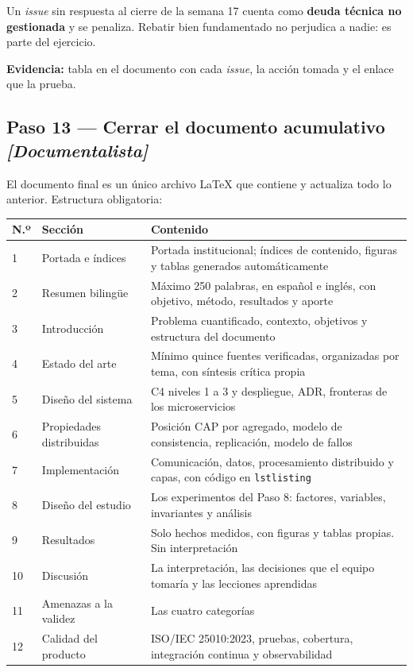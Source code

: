 \documentclass[11pt,a4paper]{article}
\newcommand{\paso}[1]{\subsection{#1}}
\begin{document}
	Un \emph{issue} sin respuesta al cierre de la semana 17 cuenta como \textbf{deuda técnica no gestionada} y se penaliza. Rebatir bien fundamentado no perjudica a nadie: es parte del ejercicio.
	
	\textbf{Evidencia:} tabla en el documento con cada \emph{issue}, la acción tomada y el enlace que la prueba.
	
	\paso{Paso 13 --- Cerrar el documento acumulativo \emph{[Documentalista]}}
	
	El documento final es un único archivo LaTeX que contiene y actualiza todo lo anterior. Estructura obligatoria:
	
	\begin{center}
		\footnotesize
		\begin{longtable}{@{}p{0.7cm}p{4.4cm}p{10.1cm}@{}}
			\toprule
			\textbf{N.º} & \textbf{Sección} & \textbf{Contenido} \\
			\midrule
			\endhead
			1 & Portada e índices & Portada institucional; índices de contenido, figuras y tablas generados automáticamente \\
			2 & Resumen bilingüe & Máximo 250 palabras, en español e inglés, con objetivo, método, resultados y aporte \\
			3 & Introducción & Problema cuantificado, contexto, objetivos y estructura del documento \\
			4 & Estado del arte & Mínimo quince fuentes verificadas, organizadas por tema, con síntesis crítica propia \\
			5 & Diseño del sistema & C4 niveles 1 a 3 y despliegue, ADR, fronteras de los microservicios \\
			6 & Propiedades distribuidas & Posición CAP por agregado, modelo de consistencia, replicación, modelo de fallos \\
			7 & Implementación & Comunicación, datos, procesamiento distribuido y capas, con código en \texttt{lstlisting} \\
			8 & Diseño del estudio & Los experimentos del Paso 8: factores, variables, invariantes y análisis \\
			9 & Resultados & Solo hechos medidos, con figuras y tablas propias. Sin interpretación \\
			10 & Discusión & La interpretación, las decisiones que el equipo tomaría y las lecciones aprendidas \\
			11 & Amenazas a la validez & Las cuatro categorías \\
			12 & Calidad del producto & ISO/IEC 25010:2023, pruebas, cobertura, integración continua y observabilidad \\

\end{longtable}
\end{center}
\end{document}
